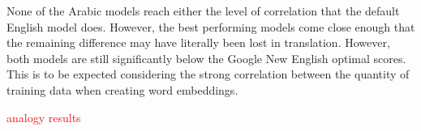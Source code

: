 None of the Arabic models reach either the level of correlation that the default English model does. However, the best performing models come close enough that the remaining difference may have literally been lost in translation. However, both models are still significantly below the Google New English optimal scores. This is to be expected considering the strong correlation between the quantity of training data when creating word embeddings.







\textcolor{red}{analogy results}




















